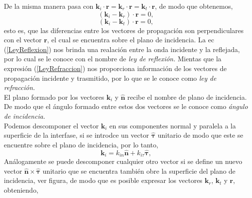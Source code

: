 \documentclass[11pt,fleqn]{book} %
\begin{document}
De la misma manera pasa con $\textbf{k}_i \cdot \textbf{r}=\textbf{k}_r \cdot \textbf{r}=\textbf{k}_t \cdot \textbf{r}$, de modo que obtenemos,
\begin{equation}
(\textbf{k}_i-\textbf{k}_r)\cdot\textbf{r}=0,  \label{LeyReflexion}
\end{equation}
\begin{equation}
(\textbf{k}_i-\textbf{k}_t)\cdot\textbf{r}=0,  \label{LeyRefraccion}
\end{equation}
esto es, que las diferencias entre los vectores de propagaci\'on son perpendiculares con el vector $\textbf{r}$, el cual se encuentra sobre el plano de incidencia. La ec (\ref{LeyReflexion}) nos brinda una realaci\'on entre la onda incidente y la reflejada, por lo cual se le conoce con el nombre de \textit{ley de reflexi\'on.} Mientas que la expresi\'on (\ref{LeyRefraccion}) nos proporciona informaci\'on de los vectores de propagaci\'on incidente y trasmitido, por lo que se le conoce como \textit{ley de refracci\'on.}\\
El plano formado por los vectores $\textbf{k}_i$ y $\hat{\textbf{n}}$ recibe el nombre de plano de incidencia. De modo que el \'angulo formado entre estos dos vectores se le conoce como \textit{\'angulo de incidencia.} \\
Podemos descomponer el vector $\textbf{k}_i$ en sus componentes normal y paralela a la superficie de la interfase, si se introdce un vector $\hat{\mathbf{\tau}}$ unitario de modo que este se encuentre sobre el plano de incidencia, por lo tanto,
\begin{equation}
\textbf{k}_i=k_{in}\hat{\textbf{n}}+k_{i\tau}\hat{\mathbf{\tau}},
\end{equation}
An\'alogamente se puede descomponer cualquier otro vector si se define un nuevo vector $\hat{\textbf{n}}\times\hat{\mathbf{\tau}}$ unitario que se encuentra tambi\'en obre la superficie del plano de incidencia, ver figura, de modo que es posible expresar los vectores $\textbf{k}_r$, $\textbf{k}_t$ y $\textbf{r}$, obteniendo,
\end{document}
